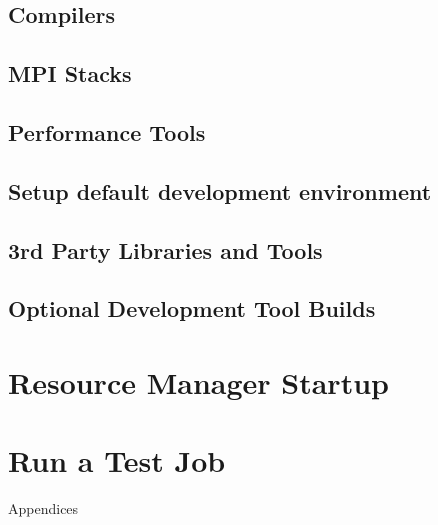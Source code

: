 \documentclass[letterpaper]{article}
\begin{document}
\subsection{Compilers} \label{sec:install_compilers}


\subsection{MPI Stacks} \label{sec:mpi}


\subsection{Performance Tools} \label{sec:install_perf_tools}


\subsection{Setup default development environment}


\vspace*{0.3cm}
\subsection{3rd Party Libraries and Tools} \label{sec:3rdparty}



\vspace*{0.1cm}

\vspace*{0.5cm}
\subsection{Optional Development Tool Builds} \label{sec:3rdparty_intel}


\clearpage
\section{Resource Manager Startup} \label{sec:rms_startup}


\section{Run a Test Job} \label{sec:test_job}


\clearpage
\appendix
{\bf \LARGE \centerline{Appendices}} \vspace*{0.2cm}

\renewcommand{\thesubsection}{\Alph{subsection}}







\end{document}
